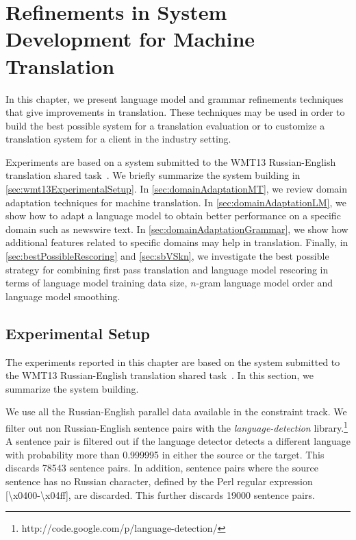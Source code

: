 \chapter{Refinements in System Development for Machine Translation}


In this chapter, we present language model and grammar refinements
techniques that give improvements in translation. These techniques
may be used in order to build the best possible system for a
translation evaluation or to customize a translation system
for a client in the industry setting.

Experiments are based on a system submitted to the WMT13
Russian-English translation shared
task~\citep{pino-waite-xiao-degispert-flego-byrne:2013:WMT}.
We briefly summarize the system building in
\autoref{sec:wmt13ExperimentalSetup}.
In \autoref{sec:domainAdaptationMT}, we review domain adaptation
techniques for machine translation. In \autoref{sec:domainAdaptationLM},
we show how to adapt a language model to obtain better performance
on a specific domain such as newswire text.
In \autoref{sec:domainAdaptationGrammar}, we show how additional
features related to specific domains may help in translation.
Finally, in \autoref{sec:bestPossibleRescoring} and \autoref{sec:sbVSkn}, we investigate
the best possible strategy for combining first pass translation
and language model rescoring in terms of language model
training data size, $n$-gram language model order and
language model smoothing.

\section{Experimental Setup}
\label{sec:wmt13ExperimentalSetup}

The experiments reported in this chapter are based
on the system submitted to the WMT13 Russian-English translation shared
task~\citep{pino-waite-xiao-degispert-flego-byrne:2013:WMT}.
In this section, we summarize the system building.

We use all the Russian-English parallel data available in the constraint track.
We filter out non Russian-English sentence pairs with the
\emph{language-detection} library.\footnote{http://code.google.com/p/language-detection/}
A sentence pair is filtered out if the language detector detects a different language with probability
more than 0.999995 in either the source or the target.
This discards 78543 sentence pairs. In addition, sentence pairs where the source sentence has no Russian character, defined by the
Perl regular expression [{\textbackslash}x{0400}-{\textbackslash}x{04ff}], are discarded.
This further discards 19000 sentence pairs.

